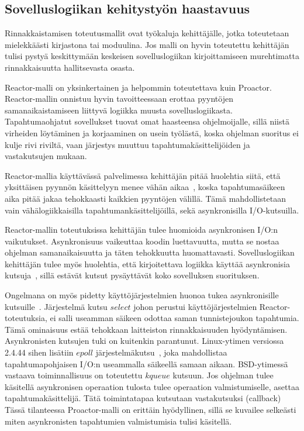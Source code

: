 \documentclass[finnish]{tktltiki2}
\theoremstyle{definition}
\theoremstyle{remark}
\begin{document}
\subsection{Sovelluslogiikan kehitystyön haastavuus}
Rinnakkaistamisen toteutusmallit ovat työkaluja kehittäjälle,
jotka toteutetaan mielekkäästi kirjastona tai moduulina.
Jos malli on hyvin toteutettu kehittäjän tulisi pystyä
keskittymään keskeisen sovelluslogiikan kirjoittamiseen 
murehtimatta rinnakkaisuutta hallitsevasta osasta.

Reactor-malli on yksinkertainen ja helpommin toteutettava
kuin Proactor. Reactor-mallin onnistuu hyvin tavoitteessaan
erottaa pyyntöjen samanaikaistamiseen liittyvä logiikka
muusta sovelluslogiikasta.
Tapahtumaohjatut sovellukset tuovat omat haasteensa
ohjelmoijalle, sillä niistä virheiden löytäminen ja
korjaaminen on usein työlästä, koska ohjelman
suoritus ei kulje rivi riviltä, vaan järjestys
muuttuu tapahtumakäsittelijöiden ja vastakutsujen mukaan.

Reactor-mallia käyttävässä palvelimessa kehittäjän
pitää huolehtia siitä, että yksittäisen pyynnön
käsittelyyn menee vähän aikaa~\cite{pyarali_proactor_1997}, koska
tapahtumasäikeen aika pitää jakaa tehokkaasti
kaikkien pyyntöjen välillä. Tämä mahdollistetaan
vain vähälogiikkaisilla tapahtumankäsittelijöillä, sekä
asynkronisilla I/O-kutsuilla.

Reactor-mallin toteutuksissa kehittäjän tulee huomioida
asynkronisen I/O:n vaikutukset. Asynkronisuus vaikeuttaa koodin
luettavuutta, mutta se nostaa ohjelman samanaikaisuutta ja täten
tehokkuutta huomattavasti. Sovelluslogiikan kehittäjän
tulee myös huolehtia, että kirjoitettava logiikka
käyttää asynkronisia kutsuja~\cite{pyarali_proactor_1997}, sillä estävät
kutsut pysäyttävät koko sovelluksen suorituksen.

Ongelmana on myös pidetty käyttöjärjestelmien huonoa
tukea asynkronisille kutsuille~\cite{pyarali_proactor_1997}. Järjestelmä kutsu
$select$ johon perustui käyttöjärjestelmien Reactor-toteutuksia,
ei salli useamman säikeen odottaa saman tunnistejoukon tapahtumia.
Tämä ominaisuus estää tehokkaan laitteiston rinnakkaisuuden hyödyntämisen.
Asynkronisten kutsujen tuki on kuitenkin parantunut.
Linux-ytimen versiossa
2.4.44 sihen lisätiin $epoll$ järjestelmäkutsu~\cite{man_epoll}, joka
mahdollistaa tapahtumapohjaisen I/O:n useammalla säikeellä
samaan aikaan. BSD-ytimessä vastaava toiminnallisuus on toteutettu $kqueue$
kutsuun.
Jos ohjelman tulee käsitellä
asynkronisen operaation tulosta tulee operaation valmistumiselle,
asettaa tapahtumakäsittelijä. Tätä toimintatapaa kutsutaan vastakutsuksi (callback)
Tässä tilanteessa Proactor-malli on erittäin hyödyllinen, sillä se
kuvailee selkeästi miten asynkronisten tapahtumien valmistumisia tulisi käsitellä.
\end{document}
